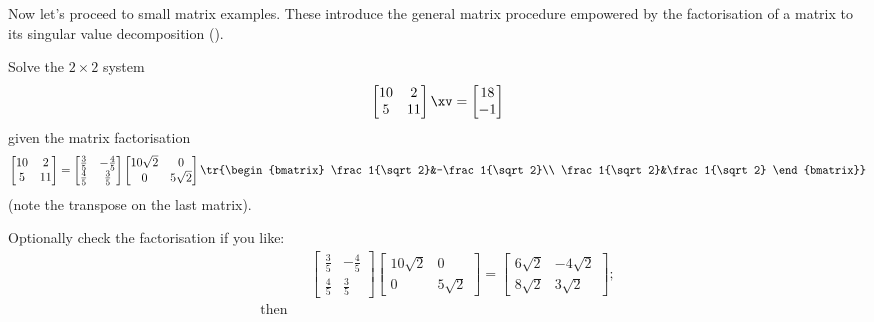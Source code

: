 Now let's proceed to small matrix examples.
These introduce the general matrix procedure empowered by the factorisation of a matrix to its singular value decomposition (\svd).
\begin{example} \label{eg:2by2svd}
Solve the \(2\times2\) system
\begin{equation*}
\begin{bmatrix} 10&2\\5&11 \end{bmatrix}\xv
=\begin{bmatrix} 18\\-1 \end{bmatrix}
\end{equation*}
given the matrix factorisation
\begin{equation*}
\begin{bmatrix} 10&2\\5&11 \end{bmatrix}=
\begin{bmatrix} \frac35&-\frac45\\\frac45&\frac35 \end{bmatrix}
\begin{bmatrix} 10\sqrt2&0\\0&5\sqrt2 \end{bmatrix}
\tr{\begin{bmatrix} \frac1{\sqrt2}&-\frac1{\sqrt2}\\ \frac1{\sqrt2}&\frac1{\sqrt2} \end{bmatrix}}
\end{equation*}
(note the transpose on the last matrix).
\begin{solution} 
Optionally check the factorisation if you like:
\begin{eqnarray*}&&
\begin{bmatrix} \frac35&-\frac45\\\frac45&\frac35 \end{bmatrix}
\begin{bmatrix} 10\sqrt2&0\\0&5\sqrt2 \end{bmatrix}
=\begin{bmatrix} 6{\sqrt2}& -4{\sqrt2}
\\ 8{\sqrt2}&3{\sqrt2} \end{bmatrix};
\\\text{then}&&

\end{eqnarray*}
\end{solution}
\end{example}
